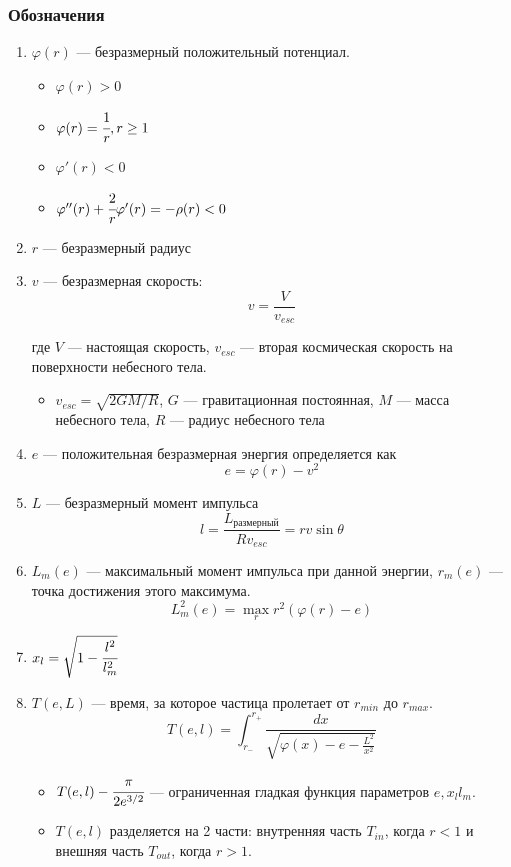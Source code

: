 \documentclass[a4paper, 14pt]{article}
\begin{document}
	\subsubsection{Обозначения}
	\begin{enumerate}
		\item $\varphi(r)$ --- безразмерный положительный потенциал.
		\begin{itemize}
			\item $\varphi(r) > 0$
			\item $\varphi(r) = \cfrac{1}{r}, r \ge 1$
			\item $\varphi'(r) < 0$
			\item $\varphi''(r) + \cfrac{2}{r}\varphi'(r) = -\rho(r) < 0$
		\end{itemize}
		\item $r$ --- безразмерный радиус
		\item $v$ --- безразмерная скорость:
		\begin{equation*}
			v = \frac{V}{v_{esc}}
		\end{equation*}

		где $V$ --- настоящая скорость, $v_{esc}$ --- вторая космическая 
		скорость на поверхности небесного тела.
		\begin{itemize}
			\item $v_{esc} = \sqrt{2GM/R}$, $G$ --- гравитационная постоянная, 
			$M$ --- масса небесного тела, $R$ --- радиус небесного тела
		\end{itemize}

		\item $e$ --- положительная безразмерная энергия определяется как
		\begin{equation*}
			e = \varphi(r) - v^2
		\end{equation*}
		\item $L$ --- безразмерный момент импульса
		\begin{equation*}
			l = \frac{L_{\text{размерный}}}{R v_{esc}} = rv\sin{\theta}
		\end{equation*}
		\item $L_m(e)$ --- максимальный момент импульса при данной энергии, 
		$r_m(e)$ --- точка достижения этого максимума.
		\begin{equation}
			L^2_m(e) = \max_r{r^2(\varphi(r)-e)}
			\label{eq:l_m_e}
		\end{equation}
		\item $x_l = \sqrt{1 - \cfrac{l^2}{l_m^2}}$
		\item $T(e,L)$ --- время, за которое частица пролетает от $r_{min}$ до $r_{max}$.
		\begin{equation*}
			T(e,l) = \int_{r_{-}}^{r_{+}}\frac{dx}{ \sqrt{\varphi(x) -e - \frac{L^{2}}{x^{2}}}}
		\end{equation*}
		\begin{itemize}
			\item $T(e,l) - \cfrac{\pi}{2e^{3/2}}$ --- ограниченная гладкая функция параметров $e, x_l l_m$.
			\item $T(e,l)$ разделяется на 2 части: 
	внутренняя часть $T_{in}$, когда $r < 1$ и внешняя часть $T_{out}$, когда $r > 1$. 
		\end{itemize}



\end{enumerate}
\end{document}
